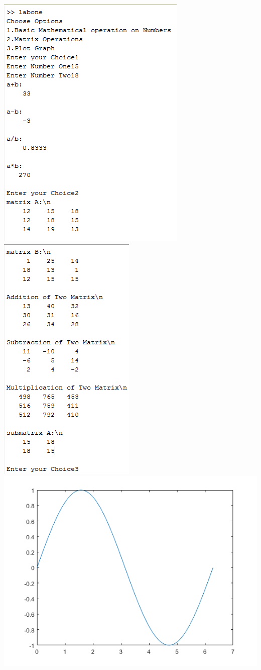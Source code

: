 \documentclass[12pt]{article}
\begin{document}
\includegraphics[scale =1.0]{output_labone_1.png}
\includegraphics[scale =1.0]{output_labone_2.png}
\includegraphics[scale =1.0]{output_labone_3.png}
\end{document}
